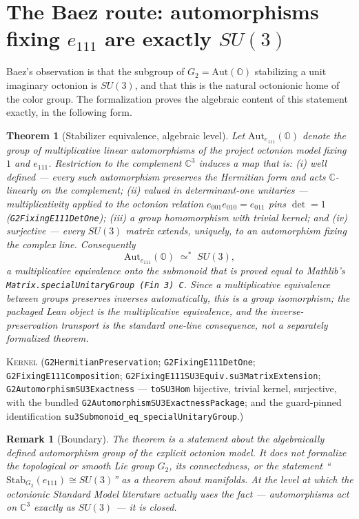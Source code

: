 \documentclass[11pt]{article}
\newcommand{\C}{\mathbb{C}}
\newcommand{\OO}{\mathbb{O}}
\newcommand{\Kernel}{\textcolor{kernelcolor}{\textsc{Kernel}}}
\newcommand{\leanname}[1]{\texttt{#1}}
\newtheorem{theorem}{Theorem}
\newtheorem{remark}{Remark}
\begin{document}
\section{The Baez route: automorphisms fixing $e_{111}$ are exactly $SU(3)$}
\label{sec:baez}

Baez's observation \cite{Baez2021} is that the subgroup of $G_2 =
\mathrm{Aut}(\OO)$ stabilizing a unit imaginary octonion is $SU(3)$, and
that this is the natural octonionic home of the color group.  The
formalization proves the algebraic content of this statement exactly,
in the following form.

\begin{theorem}[Stabilizer equivalence, algebraic level]
\label{thm:su3}
Let $\mathrm{Aut}_{e_{111}}(\OO)$ denote the group of multiplicative
linear automorphisms of the project octonion model fixing $1$ and
$e_{111}$.  Restriction to the complement $\C^3$ induces a map that is:
(i) well defined --- every such automorphism preserves the Hermitian form
and acts $\C$-linearly on the complement; (ii) valued in determinant-one
unitaries --- multiplicativity applied to the octonion relation
$e_{001}e_{010} = e_{011}$ pins
$\det = 1$ (\leanname{G2FixingE111DetOne}); (iii) a group homomorphism with trivial kernel; and (iv)
surjective --- every $SU(3)$ matrix extends, uniquely, to an automorphism
fixing the complex line.  Consequently
\[
\mathrm{Aut}_{e_{111}}(\OO) \;\simeq^*\; SU(3),
\]
a multiplicative equivalence onto the submonoid that is proved
\emph{equal} to Mathlib's
\leanname{Matrix.specialUnitaryGroup (Fin 3) C}.  Since a multiplicative
equivalence between groups preserves inverses automatically, this is a
group isomorphism; the packaged Lean object is the multiplicative
equivalence, and the inverse-preservation transport is the standard
one-line consequence, not a separately formalized theorem.
\end{theorem}
\noindent\Kernel{}\quad
(\leanname{G2HermitianPreservation};
\leanname{G2FixingE111DetOne};
\leanname{G2FixingE111Composition};
\leanname{G2FixingE111SU3Equiv.su3MatrixExtension};
\leanname{G2AutomorphismSU3Exactness} ---
\leanname{toSU3Hom} bijective, trivial kernel, surjective, with the
bundled \leanname{G2AutomorphismSU3ExactnessPackage}; and the
guard-pinned identification
\leanname{su3Submonoid\_eq\_specialUnitaryGroup}.)

\begin{remark}[Boundary]
The theorem is a statement about the algebraically defined automorphism
group of the explicit octonion model.  It does not formalize the
topological or smooth Lie group $G_2$, its connectedness, or the
statement ``$\mathrm{Stab}_{G_2}(e_{111}) \cong SU(3)$'' as a theorem
about manifolds.  At the level at which the octonionic Standard Model
literature actually uses the fact --- automorphisms act on
$\C^3$ exactly as $SU(3)$ --- it is closed.
\end{remark}
\end{document}
